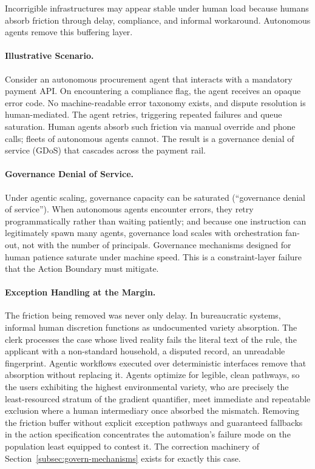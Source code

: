 \documentclass{article}
\theoremstyle{definition}
\begin{document}
Incorrigible infrastructures may appear stable under human load because humans absorb friction through delay, compliance, and informal workaround. Autonomous agents remove this buffering layer.

\paragraph{Illustrative Scenario.} Consider an autonomous procurement agent that interacts with a mandatory payment API. On encountering a compliance flag, the agent receives an opaque error code. No machine-readable error taxonomy exists, and dispute resolution is human-mediated. The agent retries, triggering repeated failures and queue saturation. Human agents absorb such friction via manual override and phone calls; fleets of autonomous agents cannot. The result is a governance denial of service (GDoS) that cascades across the payment rail.

\paragraph{Governance Denial of Service.} Under agentic scaling, governance capacity can be saturated (``governance denial of service''). When autonomous agents encounter errors, they retry programmatically rather than waiting patiently; and because one instruction can legitimately spawn many agents, governance load scales with orchestration fan-out, not with the number of principals. Governance mechanisms designed for human patience saturate under machine speed. This is a constraint-layer failure that the Action Boundary must mitigate.

\paragraph{Exception Handling at the Margin.} The friction being removed was never only delay. In bureaucratic systems, informal human discretion functions as undocumented variety absorption. The clerk processes the case whose lived reality fails the literal text of the rule, the applicant with a non-standard household, a disputed record, an unreadable fingerprint. Agentic workflows executed over deterministic interfaces remove that absorption without replacing it. Agents optimize for legible, clean pathways, so the users exhibiting the highest environmental variety, who are precisely the least-resourced stratum of the gradient quantifier, meet immediate and repeatable exclusion where a human intermediary once absorbed the mismatch. Removing the friction buffer without explicit exception pathways and guaranteed fallbacks in the action specification concentrates the automation's failure mode on the population least equipped to contest it. The correction machinery of Section~\ref{subsec:govern-mechanisms} exists for exactly this case.
\end{document}
